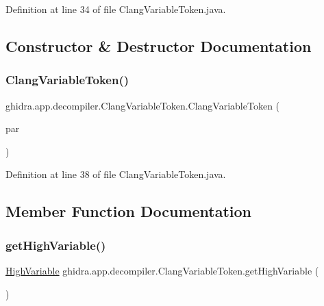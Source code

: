 Definition at line 34 of file Clang\+Variable\+Token.\+java.



\subsection{Constructor \& Destructor Documentation}
\mbox{\label{classghidra_1_1app_1_1decompiler_1_1_clang_variable_token_a606cf387dc3bb373fb390c4434c96f70}} 
\subsubsection{\texorpdfstring{ClangVariableToken()}{ClangVariableToken()}}
{\footnotesize\ttfamily ghidra.\+app.\+decompiler.\+Clang\+Variable\+Token.\+Clang\+Variable\+Token (\begin{DoxyParamCaption}\item[{\mbox{\hyperlink{interfaceghidra_1_1app_1_1decompiler_1_1_clang_node}{Clang\+Node}}}]{par }\end{DoxyParamCaption})\hspace{0.3cm}{\ttfamily [inline]}}



Definition at line 38 of file Clang\+Variable\+Token.\+java.



\subsection{Member Function Documentation}
\mbox{\label{classghidra_1_1app_1_1decompiler_1_1_clang_variable_token_a718ec8cced1a9f92ceb304d63c549613}} 
\subsubsection{\texorpdfstring{getHighVariable()}{getHighVariable()}}
{\footnotesize\ttfamily \mbox{\hyperlink{class_high_variable}{High\+Variable}} ghidra.\+app.\+decompiler.\+Clang\+Variable\+Token.\+get\+High\+Variable (\begin{DoxyParamCaption}{ }\end{DoxyParamCaption})\hspace{0.3cm}{\ttfamily [inline]}}



